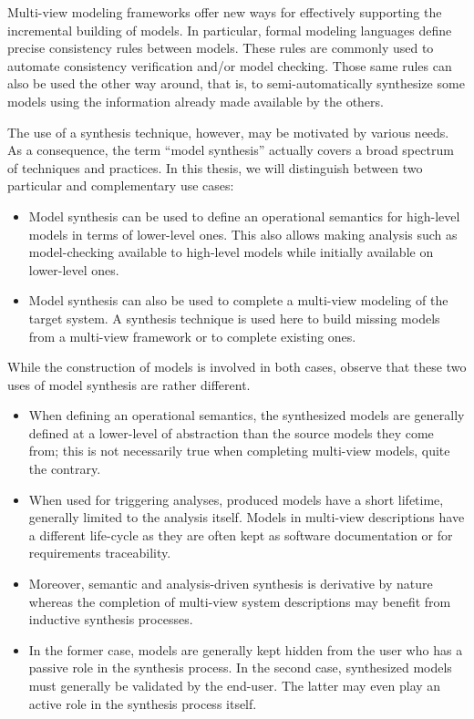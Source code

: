 Multi-view modeling frameworks offer new ways for effectively supporting the incremental building of models. In particular, formal modeling languages define precise consistency rules between models. These rules are commonly used to automate consistency verification and/or model checking. Those same rules can also be used the other way around, that is, to semi-automatically synthesize some models using the information already made available by the others.

The use of a synthesis technique, however, may be motivated by various needs. As a consequence, the term ``model synthesis'' actually covers a broad spectrum of techniques and practices. In this thesis, we will distinguish between two particular and complementary use cases:
\begin{itemize}
\item Model synthesis can be used to define an operational semantics for high-level models in terms of lower-level ones. This also allows making analysis such as model-checking available to high-level models while initially available on lower-level ones.
\item Model synthesis can also be used to complete a multi-view modeling of the target system. A synthesis technique is used here to build missing models from a multi-view framework or to complete existing ones.
\end{itemize}

While the construction of models is involved in both cases, observe that these two uses of model synthesis are rather different.
\begin{itemize}
\item When defining an operational semantics, the synthesized models are generally defined at a lower-level of abstraction than the source models they come from; this is not necessarily true when completing multi-view models, quite the contrary.
\item When used for triggering analyses, produced models have a short lifetime, generally limited to the analysis itself. Models in multi-view descriptions have a different life-cycle as they are often kept as software documentation or for requirements traceability. 
\item Moreover, semantic and analysis-driven synthesis is derivative by nature whereas the completion of multi-view system descriptions may benefit from inductive synthesis processes.
\item In the former case, models are generally kept hidden from the user who has a passive role in the synthesis process. In the second case, synthesized models must generally be validated by the end-user. The latter may even play an active role in the synthesis process itself.
\end{itemize}

